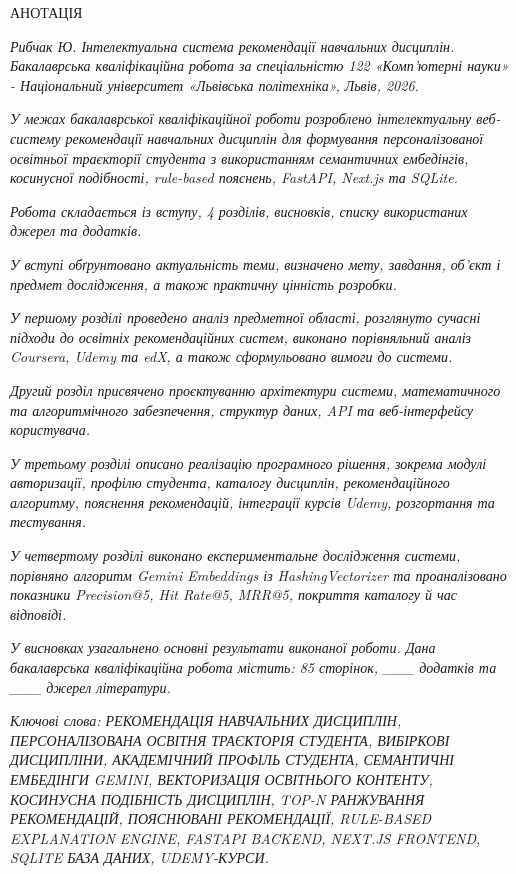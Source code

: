 \documentclass[
]{article}
\author{}
\date{}
\begin{document}
\protect{}\label{_Toc230434074}{}АНОТАЦІЯ

\emph{Рибчак Ю. Інтелектуальна система рекомендації навчальних
дисциплін. Бакалаврська кваліфікаційна робота за спеціальністю 122
«Комп'ютерні науки» - Національний університет «Львівська політехніка»,
Львів, 2026.}

\emph{У межах бакалаврської кваліфікаційної роботи розроблено
інтелектуальну веб-систему рекомендації навчальних дисциплін для
формування персоналізованої освітньої траєкторії студента з
використанням семантичних ембедінгів, косинусної подібності, rule-based
пояснень, FastAPI, Next.js та SQLite.}

\emph{Робота складається із вступу, 4 розділів, висновків, списку
використаних джерел та додатків.}

\emph{У вступі обґрунтовано актуальність теми, визначено мету, завдання,
об'єкт і предмет дослідження, а також практичну цінність розробки.}

\emph{У першому розділі проведено аналіз предметної області, розглянуто
сучасні підходи до освітніх рекомендаційних систем, виконано
порівняльний аналіз Coursera, Udemy та edX, а також сформульовано вимоги
до системи.}

\emph{Другий розділ присвячено проєктуванню архітектури системи,
математичного та алгоритмічного забезпечення, структур даних, API та
веб-інтерфейсу користувача.}

\emph{У третьому розділі описано реалізацію програмного рішення, зокрема
модулі авторизації, профілю студента, каталогу дисциплін,
рекомендаційного алгоритму, пояснення рекомендацій, інтеграції курсів
Udemy, розгортання та тестування.}

\emph{У четвертому розділі виконано експериментальне дослідження
системи, порівняно алгоритм Gemini Embeddings із HashingVectorizer та
проаналізовано показники Precision@5, Hit Rate@5, MRR@5, покриття
каталогу й час відповіді.}

\emph{У висновках узагальнено основні результати виконаної роботи. Дана
бакалаврська кваліфікаційна робота містить: 85 сторінок, \_\_\_ додатків
та \_\_\_ джерел літератури.}

\emph{Ключові слова: РЕКОМЕНДАЦІЯ НАВЧАЛЬНИХ ДИСЦИПЛІН, ПЕРСОНАЛІЗОВАНА
ОСВІТНЯ ТРАЄКТОРІЯ СТУДЕНТА, ВИБІРКОВІ ДИСЦИПЛІНИ, АКАДЕМІЧНИЙ ПРОФІЛЬ
СТУДЕНТА, СЕМАНТИЧНІ ЕМБЕДІНГИ GEMINI, ВЕКТОРИЗАЦІЯ ОСВІТНЬОГО КОНТЕНТУ,
КОСИНУСНА ПОДІБНІСТЬ ДИСЦИПЛІН, TOP-N РАНЖУВАННЯ РЕКОМЕНДАЦІЙ,
ПОЯСНЮВАНІ РЕКОМЕНДАЦІЇ, RULE-BASED EXPLANATION ENGINE, FASTAPI BACKEND,
NEXT.JS FRONTEND, SQLITE БАЗА ДАНИХ, UDEMY-КУРСИ.}
\end{document}

